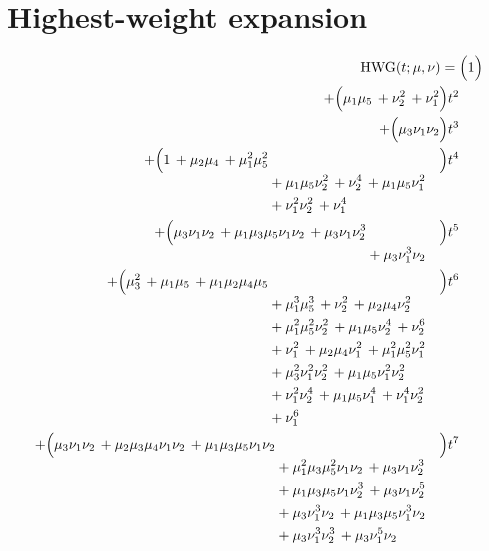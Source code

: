 \documentclass[10pt]{article}
\begin{document}
\section{Highest-weight expansion}
\[
\begin{aligned}
\mathrm{HWG}(t;\mu,\nu) ={}&
   \Bigl(1\Bigr) \\
  + \Bigl(\mu_1\mu_5\,+\nu_2^{2}\,+\nu_1^{2}\Bigr)t^{2} \\
  + \Bigl(\mu_3\nu_1\nu_2\Bigr)t^{3} \\
  + \Bigl(\begin{aligned}[t]1\,+\mu_2\mu_4\,+\mu_1^{2}\mu_5^{2} \\
  &{}+\mu_1\mu_5\nu_2^{2}\,+\nu_2^{4}\,+\mu_1\mu_5\nu_1^{2} \\
  &{}+\nu_1^{2}\nu_2^{2}\,+\nu_1^{4}\end{aligned}\Bigr)t^{4} \\
  + \Bigl(\begin{aligned}[t]\mu_3\nu_1\nu_2\,+\mu_1\mu_3\mu_5\nu_1\nu_2\,+\mu_3\nu_1\nu_2^{3} \\
  &{}+\mu_3\nu_1^{3}\nu_2\end{aligned}\Bigr)t^{5} \\
  + \Bigl(\begin{aligned}[t]\mu_3^{2}\,+\mu_1\mu_5\,+\mu_1\mu_2\mu_4\mu_5 \\
  &{}+\mu_1^{3}\mu_5^{3}\,+\nu_2^{2}\,+\mu_2\mu_4\nu_2^{2} \\
  &{}+\mu_1^{2}\mu_5^{2}\nu_2^{2}\,+\mu_1\mu_5\nu_2^{4}\,+\nu_2^{6} \\
  &{}+\nu_1^{2}\,+\mu_2\mu_4\nu_1^{2}\,+\mu_1^{2}\mu_5^{2}\nu_1^{2} \\
  &{}+\mu_3^{2}\nu_1^{2}\nu_2^{2}\,+\mu_1\mu_5\nu_1^{2}\nu_2^{2} \\
  &{}+\nu_1^{2}\nu_2^{4}\,+\mu_1\mu_5\nu_1^{4}\,+\nu_1^{4}\nu_2^{2} \\
  &{}+\nu_1^{6}\end{aligned}\Bigr)t^{6} \\
  + \Bigl(\begin{aligned}[t]\mu_3\nu_1\nu_2\,+\mu_2\mu_3\mu_4\nu_1\nu_2\,+\mu_1\mu_3\mu_5\nu_1\nu_2 \\
  &{}+\mu_1^{2}\mu_3\mu_5^{2}\nu_1\nu_2\,+\mu_3\nu_1\nu_2^{3} \\
  &{}+\mu_1\mu_3\mu_5\nu_1\nu_2^{3}\,+\mu_3\nu_1\nu_2^{5} \\
  &{}+\mu_3\nu_1^{3}\nu_2\,+\mu_1\mu_3\mu_5\nu_1^{3}\nu_2 \\
  &{}+\mu_3\nu_1^{3}\nu_2^{3}\,+\mu_3\nu_1^{5}\nu_2\end{aligned}\Bigr)t^{7} \\

\end{aligned}\]
\end{document}
